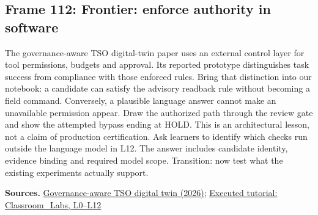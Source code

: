 \documentclass[11pt]{article}
\begin{document}
\subsection*{Frame 112: Frontier: enforce authority in software}
The governance-aware TSO digital-twin paper uses an external control layer for tool permissions, budgets and approval. Its reported prototype distinguishes task success from compliance with those enforced rules. Bring that distinction into our notebook: a candidate can satisfy the advisory readback rule without becoming a field command. Conversely, a plausible language answer cannot make an unavailable permission appear. Draw the authorized path through the review gate and show the attempted bypass ending at HOLD. This is an architectural lesson, not a claim of production certification. Ask learners to identify which checks run outside the language model in L12. The answer includes candidate identity, evidence binding and required model scope. Transition: now test what the existing experiments actually support.\par
\par\nopagebreak\begin{minipage}{\linewidth}{\footnotesize\color{slate}\textbf{Sources.} \href{https://arxiv.org/html/2609.22476v1}{Governance-aware TSO digital twin (2026)}; \href{../Classroom_Labs.html}{Executed tutorial: Classroom\_Labs, L0--L12}\par}\end{minipage}\par\medskip
\end{document}
